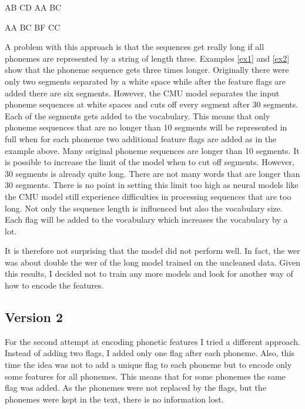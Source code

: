 \begin{covexamples}
\item \label{ex1}  AB CD  AA BC
\item \label{ex2}  AA BC   BF CC
\end{covexamples}

A problem with this approach is that the sequences get really long if all phonemes are represented by a string of length three.  Examples \ref{ex1} and \ref{ex2} show that the phoneme sequence gets three times longer. Originally there were only two segments separated by a white space while after the feature flags are added there are six segments. However, the CMU model separates the input phoneme sequences at white spaces and cuts off every segment after 30 segments. Each of the segments gets added to the vocabulary. This means that only phoneme sequences that are no longer than 10 segments will be represented in full when for each phoneme two additional feature flags are added as in the example above. Many original phoneme sequences are longer than 10 segments. It is possible to increase the limit of the model when to cut off segments. However, 30 segments is already quite long. There are not many words that are longer than 30 segments. There is no point in setting this limit too high as neural models like the CMU model still experience difficulties in processing sequences that are too long. Not only the sequence length is influenced but also the vocabulary size. Each flag will be added to the vocabulary which increases the vocabulary by a lot.  

It is therefore not surprising that the model did not perform well. In fact, the \ac{wer} was about double the \ac{wer} of the long model trained on the uncleaned data. Given this results, I decided not to train any more models and look for another way of how to encode the features.

\subsection*{Version 2}
For the second attempt at encoding phonetic features I tried a different approach. Instead of adding two flags, I added only one flag after each phoneme. Also, this time the idea was not to add a unique flag to each phoneme but to encode only some features for all phonemes. This means that for some phonemes the same flag was added. As the phonemes were not replaced by the flags, but the phonemes were kept in the text, there is no information lost. 

